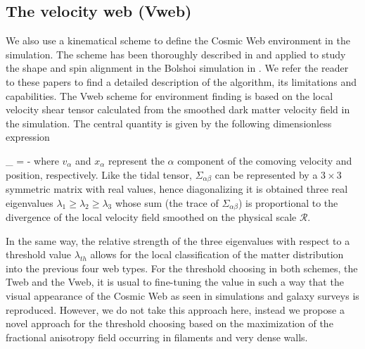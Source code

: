 \documentclass[a4,useAMS,usenatbib,usegraphicx]{latex/mn2e}
\begin{document}
\subsection{The velocity web (Vweb)}
\label{subsec:Vweb}


We also use a kinematical scheme to define the Cosmic Web environment in 
the simulation. The scheme has been thoroughly described in 
\citet{Hoffman12} and applied to study the shape and spin alignment in the
Bolshoi simulation in \citet{Libeskind13}. We refer the reader to these 
papers to find a detailed description of the algorithm, its limitations 
and capabilities. The Vweb scheme for environment finding is based on the
local velocity shear tensor calculated from the smoothed dark matter 
velocity field in the simulation. The central quantity is given by the 
following dimensionless expression


{	\Sigma_{\alpha\beta} = -	}
where $v_{\alpha}$ and $x_{\alpha}$ represent the $\alpha$ component of 
the comoving velocity and position, respectively. Like the tidal tensor, 
$\Sigma_{\alpha\beta}$ can be represented by a $3\times 3$ symmetric 
matrix with real values, hence diagonalizing it is obtained three real 
eigenvalues $\lambda_{1}\geq\lambda_{2}\geq\lambda_3$ whose sum (the 
trace of $\Sigma_{\alpha\beta}$) is proportional to the divergence of the 
local velocity field smoothed on the physical scale ${\mathcal R}$. 


In the same way, the relative strength of the three eigenvalues with 
respect to a threshold value $\lambda_{th}$ allows for the local 
classification of the matter distribution into the previous four web types. 
For the threshold choosing in both schemes, the Tweb and the Vweb, it is
usual to fine-tuning the value in such a way that the visual appearance of
the Cosmic Web as seen in simulations and galaxy surveys is reproduced. 
However, we do not take this approach here, instead we propose a novel 
approach for the threshold choosing based on the maximization of the 
fractional anisotropy field occurring in filaments and very dense walls.


\end{document}
